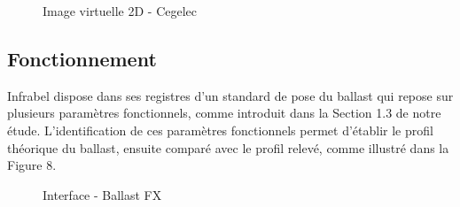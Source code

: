 \begin{itemize}
    \begin{figure}[H]
            \centering
            \caption{Image virtuelle 2D - Cegelec \cite{RHEA}} 
        \end{figure}
    
\end{itemize}







\subsection{Fonctionnement}

Infrabel dispose dans ses registres d'un standard de pose du ballast qui repose sur plusieurs paramètres fonctionnels, comme introduit dans la Section 1.3 de notre étude. L'identification de ces paramètres fonctionnels permet d'établir le profil théorique du ballast, ensuite comparé avec le profil relevé, comme illustré dans la Figure 8.


\begin{figure}[H]
            \centering
            \caption{Interface - Ballast FX } 
        \end{figure}

